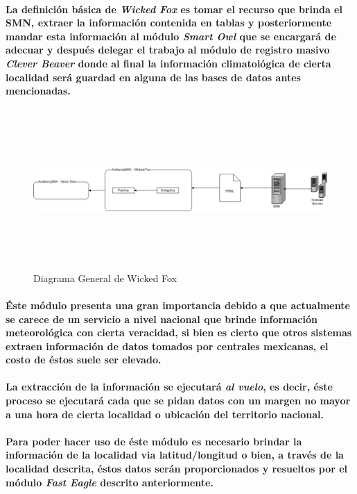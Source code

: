     \paragraph{ La definición básica de \textbf{\emph{Wicked Fox}} es tomar el recurso que brinda el SMN, extraer la información contenida en tablas y posteriormente mandar esta información al módulo \textbf{\emph{Smart Owl}} que se encargará de adecuar y después delegar el trabajo al módulo de registro masivo \textbf{\emph{Clever Beaver}} donde al final la información climatológica de cierta localidad será guardad en alguna de las bases de datos antes mencionadas.}
      \begin{landscape}
        \begin{figure}[b!]
        \centering
        \includegraphics[width=14cm,height=6cm]{./images/DiagramaWickedFox.png}
        \caption{Diagrama General de Wicked Fox}
      \end{figure}
      \end{landscape}
    \paragraph{Éste módulo presenta una gran importancia debido a que actualmente se carece de un servicio a nivel nacional que brinde información meteorológica con cierta veracidad, si bien es cierto que otros sistemas extraen información de datos tomados por centrales mexicanas, el costo de éstos suele ser elevado.}
    \paragraph{La extracción de la información se ejecutará \emph{al vuelo}, es decir, éste proceso se ejecutará cada que se pidan datos con un margen no mayor a una hora de cierta localidad o ubicación del territorio nacional.}
    \paragraph{Para poder hacer uso de éste módulo es necesario brindar la información de la localidad via latitud/longitud o bien, a través de la localidad descrita, éstos datos serán proporcionados y resueltos por el módulo \textbf{\emph{Fast Eagle}} descrito anteriormente.}